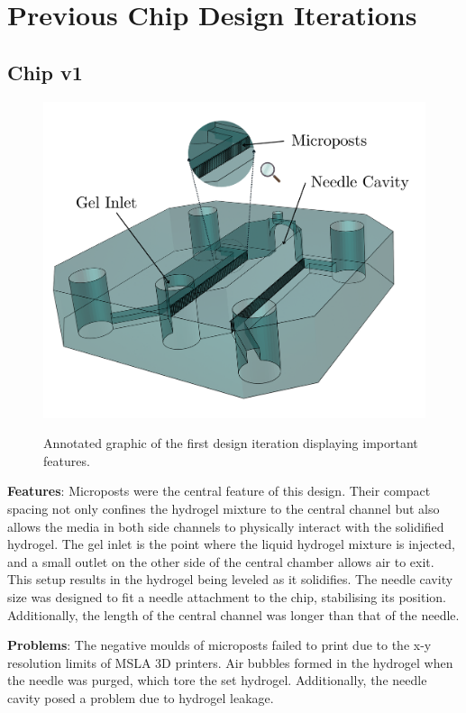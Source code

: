 \documentclass[letterpaper,12pt]{article}
\begin{document}
\newpage

\section{Previous Chip Design Iterations} \label{app_chip_evolution}

\subsection{Chip v1}
\begin{figure}[!h]
    \centering
    \includegraphics[width=0.8\linewidth]{dapp_report/figures/first_iter.png}
    \label{fig:first_iter}
    \caption{Annotated graphic of the first design iteration displaying important features.}
\end{figure}

\textbf{Features}: Microposts were the central feature of this design. Their compact spacing not only confines the hydrogel mixture to the central channel but also allows the media in both side channels to physically interact with the solidified hydrogel. The gel inlet is the point where the liquid hydrogel mixture is injected, and a small outlet on the other side of the central chamber allows air to exit. This setup results in the hydrogel being leveled as it solidifies. The needle cavity size was designed to fit a needle attachment to the chip, stabilising its position. Additionally, the length of the central channel was longer than that of the needle.

\textbf{Problems}: The negative moulds of microposts failed to print due to the x-y resolution limits of MSLA 3D printers. Air bubbles formed in the hydrogel when the needle was purged, which tore the set hydrogel. Additionally, the needle cavity posed a problem due to hydrogel leakage. 
\end{document}
